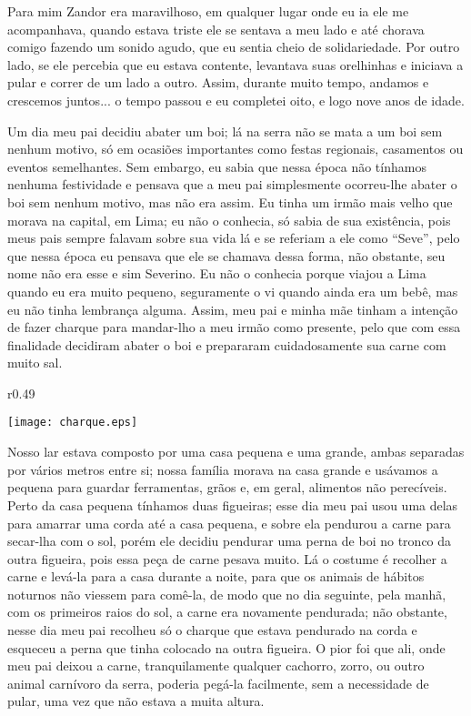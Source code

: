 Para mim Zandor era maravilhoso, em qualquer lugar onde eu ia ele me acompanhava, quando estava triste ele se sentava a meu lado e até chorava comigo fazendo um sonido agudo, que eu sentia cheio de solidariedade. 
Por outro lado, se ele percebia que eu estava contente, levantava suas orelhinhas e iniciava a pular e correr de um lado a outro. Assim, durante muito tempo, andamos e crescemos juntos... o tempo passou e eu completei oito, e logo nove anos de idade.

Um dia meu pai decidiu abater um boi; lá na serra não se mata a um boi sem nenhum motivo, só em ocasiões importantes como festas regionais, casamentos ou eventos semelhantes. Sem embargo, eu sabia que nessa época não tínhamos nenhuma festividade e pensava que a meu pai simplesmente ocorreu-lhe abater o boi sem nenhum motivo, mas não era assim. 
Eu tinha um irmão mais velho que morava na capital, em Lima; eu não o conhecia, só sabia de sua existência, pois meus pais sempre falavam sobre sua vida lá e se referiam a ele como ``Seve'', pelo que nessa época eu pensava que ele se chamava dessa forma, não obstante, seu nome não era esse e sim Severino. Eu não o conhecia porque viajou a Lima quando eu era muito pequeno, seguramente o vi quando ainda era um bebê, mas eu não tinha lembrança alguma. 
Assim, meu pai e minha mãe tinham a intenção de fazer charque para mandar-lho a meu irmão como presente, pelo que com essa finalidade decidiram abater o boi e prepararam cuidadosamente sua carne com muito sal.

\ifdefined\EnableIncludeImages
\begin{wrapfigure}{r}{0.49\textwidth}
  \begin{center}
  \vspace{-20pt}
    \texttt{[image: charque.eps]}
  \end{center}
  \vspace{-20pt}
\end{wrapfigure}
\fi
Nosso lar estava composto por uma casa pequena e uma grande, ambas separadas por vários metros entre si; nossa família morava na casa grande e usávamos a pequena para guardar ferramentas, grãos e, em geral, alimentos não perecíveis. Perto da casa pequena tínhamos duas figueiras; esse dia meu pai usou uma delas para amarrar uma corda até a casa pequena, e sobre ela pendurou a carne para secar-lha com o sol, porém ele decidiu pendurar uma perna de boi no tronco da outra figueira, pois essa peça de carne pesava muito.
Lá o costume é recolher a carne e levá-la para a casa durante a noite, para que os animais de hábitos noturnos não viessem para comê-la, de modo que no dia seguinte, pela manhã, com os primeiros raios do sol, a carne era novamente pendurada; não obstante, nesse dia meu pai recolheu só o charque que estava pendurado na corda e esqueceu a perna que tinha colocado na outra figueira. 
O pior foi que ali, onde meu pai deixou a carne, tranquilamente qualquer cachorro, zorro, ou outro animal carnívoro da serra, poderia pegá-la facilmente, sem a necessidade de pular, uma vez que não estava a muita altura.

